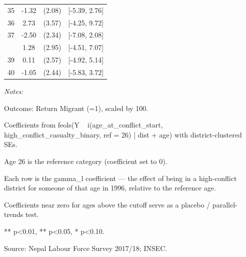 \begin{table}[!h]
\begin{threeparttable}
\begin{tabular}[t]{cccc}
35 & -1.32 & (2.08) & {}[-5.39, 2.76]\\
36 & 2.73 & (3.57) & {}[-4.25, 9.72]\\
37 & -2.50 & (2.34) & {}[-7.08, 2.08]\\
\addlinespace
38 & 1.28 & (2.95) & {}[-4.51, 7.07]\\
39 & 0.11 & (2.57) & {}[-4.92, 5.14]\\
40 & -1.05 & (2.44) & {}[-5.83, 3.72]\\
\bottomrule
\end{tabular}
\begin{tablenotes}
\item \textit{Notes:} 
\item Outcome: Return Migrant (=1), scaled by 100.
\item Coefficients from feols(Y ~ i(age_at_conflict_start, high_conflict_casualty_binary, ref = 26) | dist + age) with district-clustered SEs.
\item Age 26 is the reference category (coefficient set to 0).
\item Each row is the gamma_l coefficient — the effect of being in a high-conflict district for someone of that age in 1996, relative to the reference age.
\item Coefficients near zero for ages above the cutoff serve as a placebo / parallel-trends test.
\item *** p<0.01, ** p<0.05, * p<0.10.
\item Source: Nepal Labour Force Survey 2017/18; INSEC.
\end{tablenotes}
\end{threeparttable}
\end{table}
